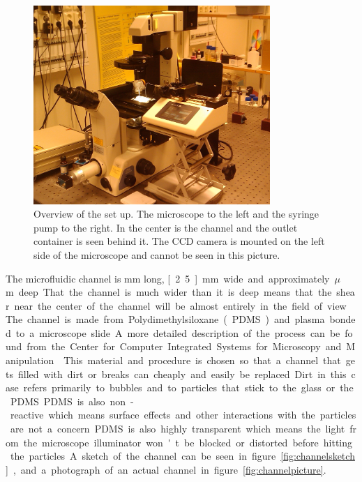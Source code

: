 \begin{figure}[H]
\centering
\includegraphics[width=0.8\textwidth]{figures/method/ExperimentalOverview.jpg}
\caption{Overview of the set up. The microscope to the left and the syringe pump to the right. In the center is the channel and the outlet container is seen behind it. The CCD camera is mounted on the left side of the microscope and cannot be seen in this picture.}\label{fig:setuppicture}
\end{figure}


The microfluidic channel is \unit[40]{mm} long, \unit[2.5]{mm} wide and approximately \unit[150]{$\mu$m} deep. That the channel is much wider than it is deep means that the shear near the center of the channel will be almost entirely in the field of view. The channel is made from Polydimethylsiloxane (PDMS) and plasma bonded to a microscope slide. A more detailed description of the process can be found from the Center for Computer Integrated Systems for Microscopy and Manipulation~\cite{PDMS}. This material and procedure is chosen so that a channel that gets filled with dirt or breaks can cheaply and easily be replaced. Dirt in this case refers primarily to bubbles and to particles that stick to the glass or the PDMS. PDMS is also non-reactive which means surface effects and other interactions with the particles are not a concern. PDMS is also highly transparent which means the light from the microscope illuminator won't be blocked or distorted before hitting the particles. A sketch of the channel can be seen in figure \ref{fig:channelsketch}, and a photograph of an actual channel in figure \ref{fig:channelpicture}. 

